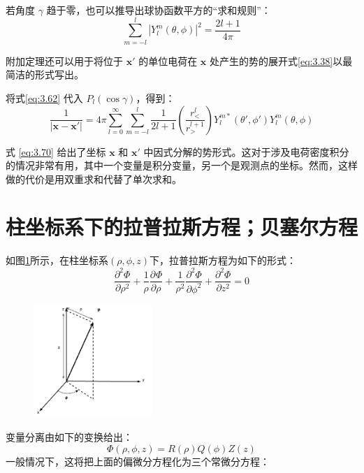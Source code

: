 \documentclass[lang=cn,10pt,newtx,bibend=biber,device=pad]{elegantbook}
\newcommand{\pderi}[3]{\dfrac{\partial^{#1}#2}{\partial {#3}^{#1}}}%
\begin{document}
若角度 $\gamma$ 趋于零，也可以推导出球协函数平方的“求和规则”：
\begin{equation}\label{eq:3.69}
    \sum_{m=-l}^l |Y_l^m(\theta, \phi)|^2 = \frac{2l + 1}{4\pi} \tag{3.69}    
\end{equation}

附加定理还可以用于将位于 $\mathbf{x}{\prime}$ 的单位电荷在 $\mathbf{x}$ 处产生的势的展开式\ref{eq:3.38}以最简洁的形式写出。

将式\ref{eq:3.62} 代入 $P_l(\cos \gamma)$，得到：
\begin{equation}\label{eq:3.70}
\frac{1}{|\mathbf{x} - \mathbf{x}{\prime}|} = 4\pi \sum_{l=0}^\infty \sum_{m=-l}^l \frac{1}{2l + 1} \left(\frac{r_<^l}{r_>^{l+1}}\right) Y_l^{m*}(\theta{\prime}, \phi{\prime}) Y_l^m(\theta, \phi) \tag{3.70}
\end{equation}

式 \ref{eq:3.70} 给出了坐标 $\mathbf{x}$ 和 $\mathbf{x}{\prime}$ 中因式分解的势形式。这对于涉及电荷密度积分的情况非常有用，其中一个变量是积分变量，另一个是观测点的坐标。然而，这样做的代价是用双重求和代替了单次求和。
\section{柱坐标系下的拉普拉斯方程；贝塞尔方程}
如图\ref{fig:cylin_coor}所示，在柱坐标系$(\rho,\phi,z)$下，拉普拉斯方程为如下的形式：
\begin{equation}\label{eq:3.71}
    \pderi{2}{\Phi}{\rho} + \frac{1}{\rho} \pderi{}{\Phi}{\rho} + \frac{1}{\rho^2} \pderi{2}{\Phi}{\phi} + \pderi{2}{\Phi}{z} = 0 
\end{equation}
\begin{figure}[h]
    \centering
    \includegraphics[width=0.4\textwidth]{figure/clyin_coor.png}
    \caption{}
    \label{fig:cylin_coor}
\end{figure}

变量分离由如下的变换给出：
\begin{equation}\label{eq:3.72}
    \Phi(\rho,\phi,z) = R(\rho) Q(\phi) Z(z)
\end{equation}
一般情况下，这将把上面的偏微分方程化为三个常微分方程：
\end{document}
